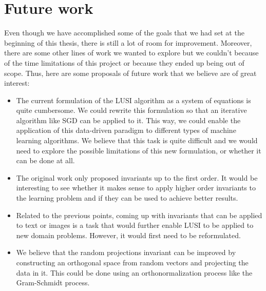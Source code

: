 \section{Future work}

Even though we have accomplished some of the goals that we had set at the beginning of this thesis,
there is still a lot of room for improvement. Moreover, there are some other lines of work we wanted
to explore but we couldn't because of the time limitations of this project or because they ended
up being out of scope. Thus, here are some proposals of future work that we believe are of great
interest:

\begin{itemize}
    \item The current formulation of the LUSI algorithm as a system of equations is quite cumbersome.
    We could rewrite this formulation so that an iterative algorithm like SGD can be applied to it.
    This way, we could enable the application of this data-driven paradigm to different types of
    machine learning algorithms. We believe that this task is quite difficult and we would need
    to explore the possible limitations of this new formulation, or whether it can be done at all.
    \item The original work only proposed invariants up to the first order. It would be interesting
    to see whether it makes sense to apply higher order invariants to the learning problem and if
    they can be used to achieve better results.
    \item Related to the previous points, coming up with invariants that can be applied to text
    or images is a task that would further enable LUSI to be applied to new domain problems. However,
    it would first need to be reformulated.
    \item We believe that the random projections invariant can be improved by constructing an orthogonal
    space from random vectors and projecting the data in it. This could be done using an orthonormalization
    process like the Gram-Schmidt process.
\end{itemize}
